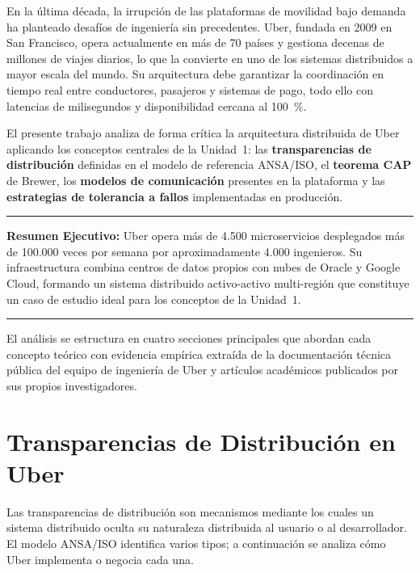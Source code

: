 \documentclass[12pt,a4paper]{article}
\begin{document}
En la última década, la irrupción de las plataformas de movilidad bajo demanda ha planteado desafíos de ingeniería sin precedentes. Uber, fundada en 2009 en San Francisco, opera actualmente en más de 70 países y gestiona decenas de millones de viajes diarios, lo que la convierte en uno de los sistemas distribuidos a mayor escala del mundo. Su arquitectura debe garantizar la coordinación en tiempo real entre conductores, pasajeros y sistemas de pago, todo ello con latencias de milisegundos y disponibilidad cercana al 100~\%.

El presente trabajo analiza de forma crítica la arquitectura distribuida de Uber aplicando los conceptos centrales de la Unidad~1: las \textbf{transparencias de distribución} definidas en el modelo de referencia ANSA/ISO, el \textbf{teorema CAP} de Brewer, los \textbf{modelos de comunicación} presentes en la plataforma y las \textbf{estrategias de tolerancia a fallos} implementadas en producción.

\vspace{0.3cm}
\begin{center}
\small
\hrule
\vspace{4pt}
\textbf{Resumen Ejecutivo:} Uber opera más de 4.500 microservicios desplegados más de 100.000 veces por semana por aproximadamente 4.000 ingenieros. Su infraestructura combina centros de datos propios con nubes de Oracle y Google Cloud, formando un sistema distribuido activo-activo multi-región que constituye un caso de estudio ideal para los conceptos de la Unidad~1.
\vspace{4pt}
\hrule
\end{center}
\vspace{0.3cm}

El análisis se estructura en cuatro secciones principales que abordan cada concepto teórico con evidencia empírica extraída de la documentación técnica pública del equipo de ingeniería de Uber y artículos académicos publicados por sus propios investigadores.

\section{Transparencias de Distribución en Uber}

Las transparencias de distribución son mecanismos mediante los cuales un sistema distribuido oculta su naturaleza distribuida al usuario o al desarrollador. El modelo ANSA/ISO identifica varios tipos; a continuación se analiza cómo Uber implementa o negocia cada una.
\end{document}
